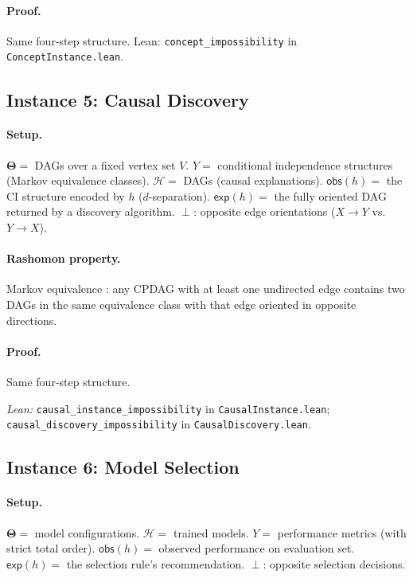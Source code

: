 \documentclass[11pt,a4paper]{article}
\newcommand{\Params}{\mathbf{\Theta}}
\newcommand{\sH}{\mathcal{H}}
\newcommand{\incomp}{\perp}
\begin{document}
\paragraph{Proof.}
Same four-step structure.  Lean:
\texttt{concept\_impossibility} in \texttt{ConceptInstance.lean}.

\subsection{Instance 5: Causal Discovery}
\label{app:proof-causal}

\paragraph{Setup.}
$\Params ={}$ DAGs over a fixed vertex set $V$.
$Y ={}$ conditional independence structures (Markov equivalence classes).
$\sH ={}$ DAGs (causal explanations).
$\mathsf{obs}(h) ={}$ the CI structure encoded by $h$ ($d$-separation).
$\mathsf{exp}(h) ={}$ the fully oriented DAG returned by a discovery algorithm.
$\incomp$: opposite edge orientations ($X \to Y$ vs.\ $Y \to X$).

\paragraph{Rashomon property.}
Markov equivalence \citep{verma1991equivalence}: any CPDAG with at least one
undirected edge contains two DAGs in the same equivalence class with that edge
oriented in opposite directions.

\paragraph{Proof.}
Same four-step structure.

{\raggedright\noindent\textit{Lean:}
\texttt{causal\_instance\_impossibility} in
\texttt{CausalInstance.lean};
\texttt{causal\_discovery\_impossibility} in
\texttt{CausalDiscovery.lean}.\par}

\subsection{Instance 6: Model Selection}
\label{app:proof-model-selection}

\paragraph{Setup.}
$\Params ={}$ model configurations.
$\sH ={}$ trained models.
$Y ={}$ performance metrics (with strict total order).
$\mathsf{obs}(h) ={}$ observed performance on evaluation set.
$\mathsf{exp}(h) ={}$ the selection rule's recommendation.
$\incomp$: opposite selection decisions.
\end{document}
